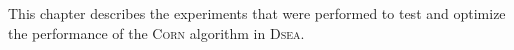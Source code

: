 This chapter describes
  the experiments that were performed
  to test and optimize
  the performance of the \textsc{Corn} algorithm in \textsc{Dsea}.
